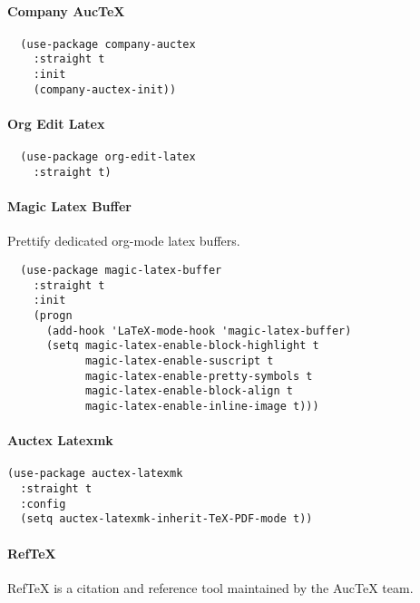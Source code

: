 \documentclass[11pt]{article}
\begin{document}
\paragraph*{Company AucTeX}
\label{sec:org7f14d47}

\begin{verbatim}
  (use-package company-auctex
    :straight t
    :init
    (company-auctex-init))
\end{verbatim}

\paragraph*{Org Edit Latex}
\label{sec:org2583e34}

\begin{verbatim}
  (use-package org-edit-latex
    :straight t)
\end{verbatim}

\paragraph*{Magic Latex Buffer}
\label{sec:orgfce3322}

Prettify dedicated org-mode latex buffers.

\begin{verbatim}
  (use-package magic-latex-buffer
    :straight t
    :init
    (progn
      (add-hook 'LaTeX-mode-hook 'magic-latex-buffer)
      (setq magic-latex-enable-block-highlight t
            magic-latex-enable-suscript t
            magic-latex-enable-pretty-symbols t
            magic-latex-enable-block-align t
            magic-latex-enable-inline-image t)))
\end{verbatim}

\paragraph*{Auctex Latexmk}
\label{sec:org49fd60e}

\begin{verbatim}
(use-package auctex-latexmk
  :straight t
  :config
  (setq auctex-latexmk-inherit-TeX-PDF-mode t))
\end{verbatim}

\paragraph*{RefTeX}
\label{sec:org3afe073}


RefTeX is a citation and reference tool maintained by the
AucTeX team.
\end{document}
